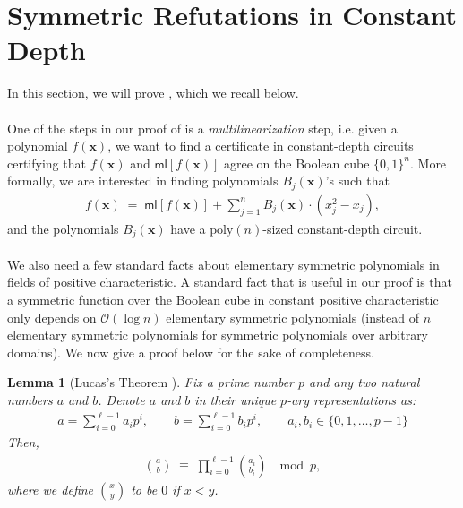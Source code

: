 \documentclass[11pt]{article}
\newtheorem{lemma}[theorem]{Lemma}
\newcommand{\Boo}{\{0,1 \}}
\newcommand{\bigO}{\mathcal{O}}
\newcommand{\ml}{\mathsf{ml}}
\begin{document}
\section{Symmetric Refutations in Constant Depth}
In this section, we will prove , which we recall below.
\symconstant*

 \paragraph{}One of the steps in our proof of  is a \emph{multilinearization} step, i.e. given a polynomial $f(\mathbf{x})$, we want to find a certificate in constant-depth circuits certifying that $f(\mathbf{x})$ and $\ml[f(\mathbf{x})]$ agree on the Boolean cube $\Boo^{n}$. More formally, we are interested in finding polynomials $B_{j}(\mathbf{x})$'s such that
 \begin{align*}
     f(\mathbf{x}) \; = \; \ml[f(\mathbf{x})] + \sum_{j=1}^{n} B_{j}(\mathbf{x}) \cdot (x_{j}^{2} - x_{j}),
 \end{align*}
 and the polynomials $B_{j}(\mathbf{x})$ have a $\mathrm{poly}(n)$-sized constant-depth circuit.




\paragraph{}We also need a few standard facts about elementary symmetric polynomials in fields of positive characteristic. A standard fact that is useful in our proof is that a symmetric function over the Boolean cube in constant positive characteristic only depends on $\bigO(\log n)$ elementary symmetric polynomials (instead of $n$ elementary symmetric polynomials for symmetric polynomials over arbitrary domains). We now give a proof below for the sake of completeness.

\begin{lemma}[Lucas's Theorem \cite{Lucas}]\label{lemma:lucas}
Fix a prime number $p$ and any two natural numbers $a$ and $b$. Denote $a$ and $b$ in their unique $p$-ary representations as:
\begin{align*}
    a = \sum_{i = 0}^{\ell - 1} a_{i} p^{i}, \quad \quad b = \sum_{i = 0}^{\ell - 1} b_{i} p^{i}, \quad \quad  a_{i}, b_{i} \in \{0,1,\ldots, p-1\}
\end{align*}
Then,
\begin{align*}
    \displaystyle\binom{a}{b} \; \equiv \; \prod_{i = 0}^{\ell - 1} \displaystyle\binom{a_{i}}{b_{i}} \; \mod{p},
\end{align*}
where we define $\binom{x}{y}$ to be $0$ if $x < y$.
\end{lemma}
\end{document}
